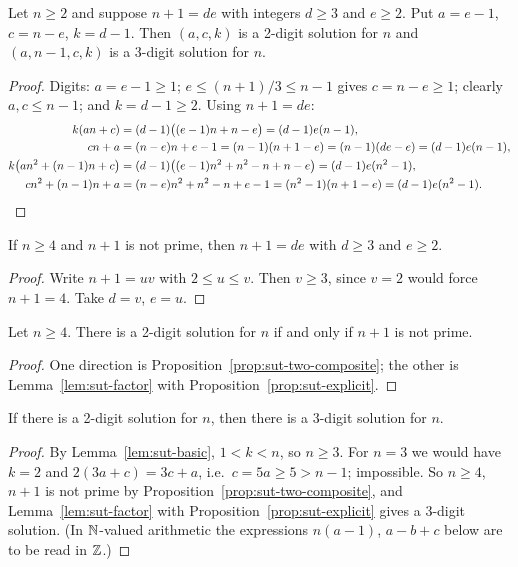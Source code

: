 \begin{proposition}\label{prop:sut-explicit}
Let $n\ge2$ and suppose $n+1=de$ with integers $d\ge3$ and $e\ge2$. Put $a=e-1$, $c=n-e$, $k=d-1$.
Then $(a,c,k)$ is a 2-digit solution for $n$ and $(a,n-1,c,k)$ is a 3-digit solution for $n$.
\end{proposition}
\begin{proof}
Digits: $a=e-1\ge1$; $e\le(n+1)/3\le n-1$ gives $c=n-e\ge1$; clearly $a,c\le n-1$; and $k=d-1\ge2$.
Using $n+1=de$:
\begin{align*}
k(an+c)&=(d-1)\bigl((e-1)n+n-e\bigr)=(d-1)e(n-1),\\
cn+a&=(n-e)n+e-1=(n-1)(n+1-e)=(n-1)(de-e)=(d-1)e(n-1),\\
k\bigl(an^2+(n-1)n+c\bigr)&=(d-1)\bigl((e-1)n^2+n^2-n+n-e\bigr)=(d-1)e(n^2-1),\\
cn^2+(n-1)n+a&=(n-e)n^2+n^2-n+e-1=(n^2-1)(n+1-e)=(d-1)e(n^2-1).\qedhere
\end{align*}
\end{proof}

\begin{lemma}[factorization]\label{lem:sut-factor}
If $n\ge4$ and $n+1$ is not prime, then $n+1=de$ with $d\ge3$ and $e\ge2$.
\end{lemma}
\begin{proof}
Write $n+1=uv$ with $2\le u\le v$. Then $v\ge3$, since $v=2$ would force $n+1=4$. Take $d=v$, $e=u$.
\end{proof}

\begin{theorem}\label{thm:sut-sutcliffe2}
Let $n\ge4$. There is a 2-digit solution for $n$ if and only if $n+1$ is not prime.
\end{theorem}
\begin{proof}
One direction is Proposition~\ref{prop:sut-two-composite}; the other is Lemma~\ref{lem:sut-factor} with
Proposition~\ref{prop:sut-explicit}.
\end{proof}

\begin{theorem}\label{thm:sut-sutcliffe3}
If there is a 2-digit solution for $n$, then there is a 3-digit solution for $n$.
\end{theorem}
\begin{proof}
By Lemma~\ref{lem:sut-basic}, $1<k<n$, so $n\ge3$. For $n=3$ we would have $k=2$ and $2(3a+c)=3c+a$,
i.e.\ $c=5a\ge5>n-1$; impossible. So $n\ge4$, $n+1$ is not prime by
Proposition~\ref{prop:sut-two-composite}, and Lemma~\ref{lem:sut-factor} with
Proposition~\ref{prop:sut-explicit} gives a 3-digit solution. (In $\mathbb{N}$-valued arithmetic the
expressions $n(a-1)$, $a-b+c$ below are to be read in $\mathbb{Z}$.)
\end{proof}

